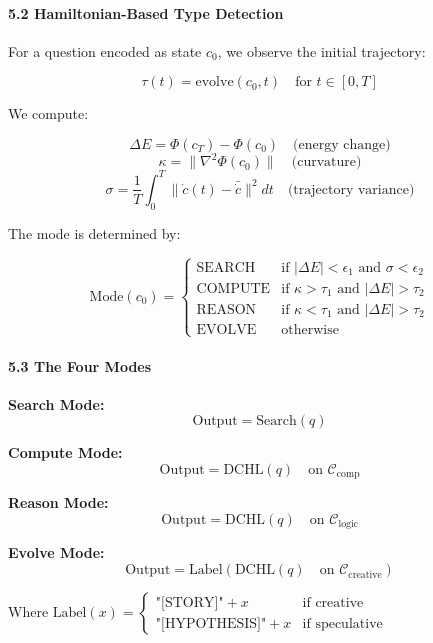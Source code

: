 \documentclass[
  11pt,
  a4paper,
]{article}
\begin{document}
\paragraph{5.2 Hamiltonian-Based Type
Detection}\label{hamiltonian-based-type-detection-1}

For a question encoded as state \(c_0\), we observe the initial
trajectory:

\[
\tau(t) = \text{evolve}(c_0, t) \quad \text{for } t \in [0, T]
\]

We compute:

\[
\Delta E = \Phi(c_T) - \Phi(c_0) \quad \text{(energy change)}
\] \[
\kappa = \|\nabla^2 \Phi(c_0)\| \quad \text{(curvature)}
\] \[
\sigma = \frac{1}{T}\int_0^T \|\dot{c}(t) - \bar{\dot{c}}\|^2 dt \quad \text{(trajectory variance)}
\]

The mode is determined by:

\[
\text{Mode}(c_0) = \begin{cases}
\text{SEARCH} & \text{if } |\Delta E| < \epsilon_1 \text{ and } \sigma < \epsilon_2 \\
\text{COMPUTE} & \text{if } \kappa > \tau_1 \text{ and } |\Delta E| > \tau_2 \\
\text{REASON} & \text{if } \kappa < \tau_1 \text{ and } |\Delta E| > \tau_2 \\
\text{EVOLVE} & \text{otherwise}
\end{cases}
\]

\paragraph{5.3 The Four Modes}\label{the-four-modes}

\textbf{Search Mode:} \[
\text{Output} = \text{Search}(q)
\]

\textbf{Compute Mode:} \[
\text{Output} = \text{DCHL}(q) \quad \text{on } \mathcal{C}_{\text{comp}}
\]

\textbf{Reason Mode:} \[
\text{Output} = \text{DCHL}(q) \quad \text{on } \mathcal{C}_{\text{logic}}
\]

\textbf{Evolve Mode:} \[
\text{Output} = \text{Label}(\text{DCHL}(q) \quad \text{on } \mathcal{C}_{\text{creative}})
\]

Where
\(\text{Label}(x) = \begin{cases} \text{"[STORY]"} + x & \text{if creative} \\ \text{"[HYPOTHESIS]"} + x & \text{if speculative} \end{cases}\)
\end{document}
